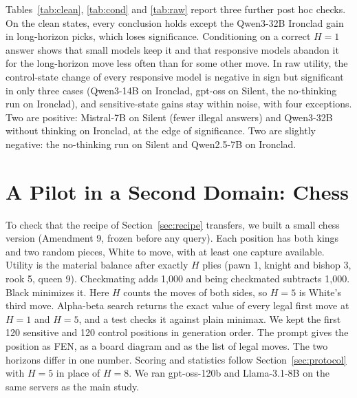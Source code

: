 Tables~\ref{tab:clean}, \ref{tab:cond} and \ref{tab:raw} report three further post hoc checks. On the clean states, every conclusion holds except the Qwen3-32B Ironclad gain in long-horizon picks, which loses significance. Conditioning on a correct $H{=}1$ answer shows that small models keep it and that responsive models abandon it for the long-horizon move less often than for some other move. In raw utility, the control-state change of every responsive model is negative in sign but significant in only three cases (Qwen3-14B on Ironclad, gpt-oss on Silent, the no-thinking run on Ironclad), and sensitive-state gains stay within noise, with four exceptions. Two are positive: Mistral-7B on Silent (fewer illegal answers) and Qwen3-32B without thinking on Ironclad, at the edge of significance. Two are slightly negative: the no-thinking run on Silent and Qwen2.5-7B on Ironclad.

\section{A Pilot in a Second Domain: Chess}
\label{app:chess}

To check that the recipe of Section~\ref{sec:recipe} transfers, we built a small chess version (Amendment 9, frozen before any query). Each position has both kings and two random pieces, White to move, with at least one capture available. Utility is the material balance after exactly $H$ plies (pawn 1, knight and bishop 3, rook 5, queen 9). Checkmating adds 1,000 and being checkmated subtracts 1,000. Black minimizes it. Here $H$ counts the moves of both sides, so $H{=}5$ is White's third move. Alpha-beta search returns the exact value of every legal first move at $H{=}1$ and $H{=}5$, and a test checks it against plain minimax. We kept the first 120 sensitive and 120 control positions in generation order. The prompt gives the position as FEN, as a board diagram and as the list of legal moves. The two horizons differ in one number. Scoring and statistics follow Section~\ref{sec:protocol} with $H{=}5$ in place of $H{=}8$. We ran gpt-oss-120b and Llama-3.1-8B on the same servers as the main study.


